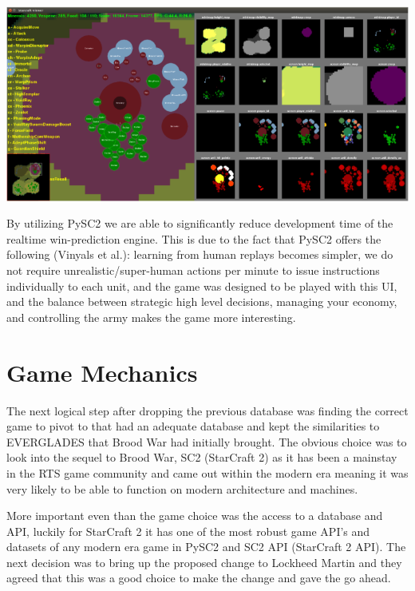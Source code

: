 \documentclass[a4paper,12pt]{report}
\begin{document}
\begin{center}
    \captionsetup{type=figure}
    \includegraphics[width=1\linewidth]{media/pysc2-1.png}
    \label{fig:pysc21}
\end{center}

By utilizing PySC2 we are able to significantly reduce development time of the realtime win-prediction engine. This is due to the fact that PySC2 offers the following (Vinyals et al.): learning from human replays becomes simpler, we do not require unrealistic/super-human actions per minute to issue instructions individually to each unit, and the game was designed to be played with this UI, and the balance between strategic high level decisions, managing your economy, and controlling the army makes the game more interesting.

\section{Game Mechanics}

The next logical step after dropping the previous database was finding the correct game to pivot to that had an adequate database and kept the similarities to EVERGLADES that Brood War had initially brought. The obvious choice was to look into the sequel to Brood War, SC2 (StarCraft 2) as it has been a mainstay in the RTS game community and came out within the modern era meaning it was very likely to be able to function on modern architecture and machines.

More important even than the game choice was the access to a database and API, luckily for StarCraft 2 it has one of the most robust game API’s and datasets of any modern era game in PySC2 and SC2 API (StarCraft 2 API). The next decision was to bring up the proposed change to Lockheed Martin and they agreed that this was a good choice to make the change and gave the go ahead.
\end{document}
